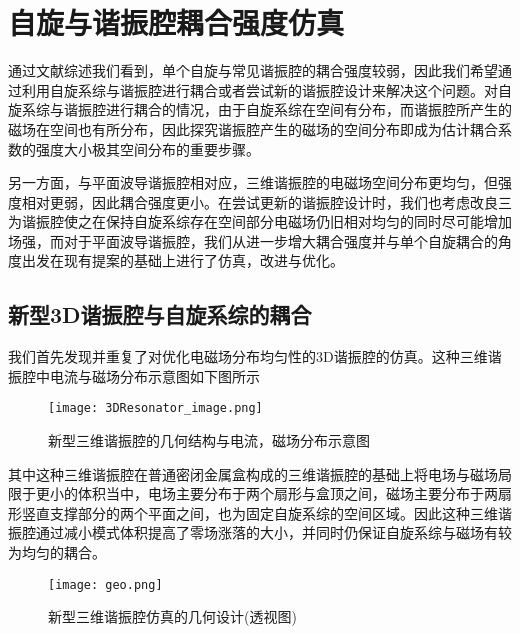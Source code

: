 \chapter{自旋与谐振腔耦合强度仿真}
\label{cha:spin_simulation}



        通过文献综述我们看到，单个自旋与常见谐振腔的耦合强度较弱，因此我们希望通过利用自旋系综与谐振腔进行耦合或者尝试新的谐振腔设计来解决这个问题。对自旋系综与谐振腔进行耦合的情况，由于自旋系综在空间有分布，而谐振腔所产生的磁场在空间也有所分布，因此探究谐振腔产生的磁场的空间分布即成为估计耦合系数的强度大小极其空间分布的重要步骤。

        另一方面，与平面波导谐振腔相对应，三维谐振腔的电磁场空间分布更均匀，但强度相对更弱，因此耦合强度更小。在尝试更新的谐振腔设计时，我们也考虑改良三为谐振腔使之在保持自旋系综存在空间部分电磁场仍旧相对均匀的同时尽可能增加场强，而对于平面波导谐振腔，我们从进一步增大耦合强度并与单个自旋耦合的角度出发在现有提案\cite{sarabi2017prospective}的基础上进行了仿真，改进与优化。

        \section{新型3D谐振腔与自旋系综的耦合} %
        \label{sec:新型3d谐振腔与自旋系综的耦合}

        我们首先发现并重复了对优化电磁场分布均匀性的3D谐振腔的仿真\cite{Angerer2016}。这种三维谐振腔中电流与磁场分布示意图如下图所示

        \begin{figure}[h]
                \centering
            \texttt{[image: 3DResonator\_image.png]}
            \caption{新型三维谐振腔的几何结构与电流，磁场分布示意图\cite{Angerer2016}}
            \label{fig:3D_Resonator_image}
        \end{figure}
        其中这种三维谐振腔在普通密闭金属盒构成的三维谐振腔的基础上将电场与磁场局限于更小的体积当中，电场主要分布于两个扇形与盒顶之间，磁场主要分布于两扇形竖直支撑部分的两个平面之间，也为固定自旋系综的空间区域。因此这种三维谐振腔通过减小模式体积提高了零场涨落的大小，并同时仍保证自旋系综与磁场有较为均匀的耦合。


        \begin{figure}[h]
                \centering
            \texttt{[image: geo.png]}
            \caption{新型三维谐振腔仿真的几何设计(透视图)}
            \label{fig:geo_3DResonator}
        \end{figure}

